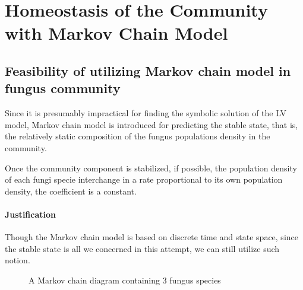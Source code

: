 \section{Homeostasis of the Community with Markov Chain Model}\label{sec:markov}


\subsection{Feasibility of utilizing Markov chain model in fungus community}

Since it is presumably impractical for finding the symbolic solution of the LV model, Markov chain model is introduced for predicting the stable state, that is, the relatively static composition of the fungus populations density in the community.

\begin{definition}
    Once the community component is stabilized, if possible, the population density of each fungi specie interchange in a rate proportional to its own population density, the coefficient is a constant.
\end{definition}

\paragraph{Justification} Though the Markov chain model is based on discrete time and state space, since the stable state is all we concerned in this attempt, we can still utilize such notion.

\begin{figure}\caption{A Markov chain diagram containing 3 fungus species}\label{fig:markov3}
    \begin{center}
    \end{center}
\end{figure}


